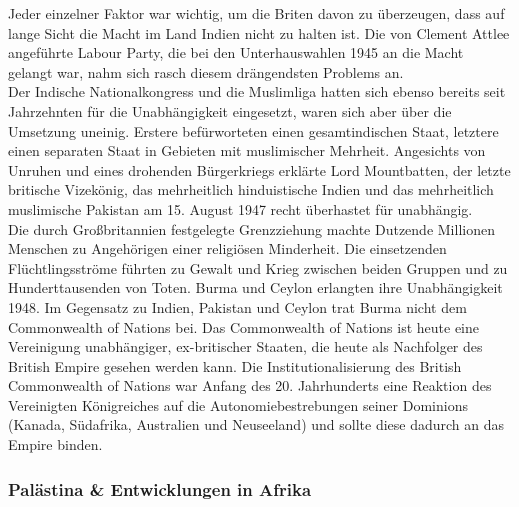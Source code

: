 \documentclass[letterpaper, 12pt]{article}
\let\tempsubsubsection\subsubsection
\renewcommand\subsubsection[1]{\vspace{0cm}\tempsubsubsection{#1}\vspace{0cm}}
\begin{document}
Jeder einzelner Faktor war wichtig, um die Briten davon zu überzeugen, dass auf lange Sicht die Macht im Land Indien nicht zu halten ist. Die von Clement Attlee angeführte Labour Party, die bei den Unterhauswahlen 1945 an die Macht gelangt war, nahm sich rasch diesem drängendsten Problems an. \\
Der Indische Nationalkongress und die Muslimliga hatten sich ebenso bereits seit Jahrzehnten für die Unabhängigkeit eingesetzt, waren sich aber über die Umsetzung uneinig. Erstere befürworteten einen gesamtindischen Staat, letztere einen separaten Staat in Gebieten mit muslimischer Mehrheit. Angesichts von Unruhen und eines drohenden Bürgerkriegs erklärte Lord Mountbatten, der letzte britische Vizekönig, das mehrheitlich hinduistische Indien und das mehrheitlich muslimische Pakistan am 15. August 1947 recht überhastet für unabhängig. \\
Die durch Großbritannien festgelegte Grenzziehung machte Dutzende Millionen Menschen zu Angehörigen einer religiösen Minderheit. Die einsetzenden Flüchtlingsströme führten zu Gewalt und Krieg zwischen beiden Gruppen und zu Hunderttausenden von Toten. Burma und Ceylon erlangten ihre Unabhängigkeit 1948. Im Gegensatz zu Indien, Pakistan und Ceylon trat Burma nicht dem Commonwealth of Nations bei. Das Commonwealth of Nations ist heute eine Vereinigung unabhängiger, ex-britischer Staaten, die heute als Nachfolger des British Empire gesehen werden kann. Die Institutionalisierung des British Commonwealth of Nations war Anfang des 20. Jahrhunderts eine Reaktion des Vereinigten Königreiches auf die Autonomiebestrebungen seiner Dominions (Kanada, Südafrika, Australien und Neuseeland) und sollte diese dadurch an das Empire binden.

\subsubsection{Palästina \& Entwicklungen in Afrika}
\end{document}
